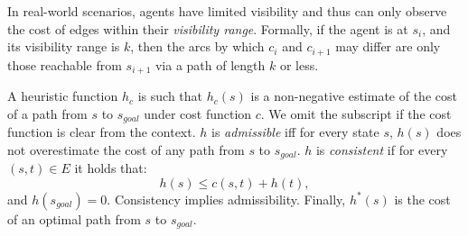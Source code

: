 \documentclass{article}
\newcommand{\sgoal}{\ensuremath{s_{\mathit{goal}}}\xspace}
\begin{document}
In real-world scenarios, agents have limited visibility and thus can only observe the cost of edges within their \emph{visibility range}. Formally, if the agent is at $s_i$, and its visibility range is $k$, then the arcs by which $c_i$ and $c_{i+1}$ may differ are only those reachable from $s_{i+1}$  via a path of length $k$ or less. 



A heuristic function $h_c$ is such that $h_c(s)$ is a non-negative estimate of the cost of a path from $s$ to $\sgoal$ under cost function $c$. We omit the subscript if the cost function is clear from the context. $h$ is \emph{admissible} iff for every state $s$, $h(s)$ does not overestimate the cost of any path from $s$ to $\sgoal$. $h$ is \emph{consistent} if for every $(s,t)\in E$ it holds that: \begin{equation}\label{eq:consistency}
  h(s)\leq c(s,t)+h(t),
\end{equation}
and $h(\sgoal)=0$. Consistency implies admissibility. Finally, $h^*(s)$ is the cost of  an optimal path from $s$ to \sgoal.





% 
\end{document}
